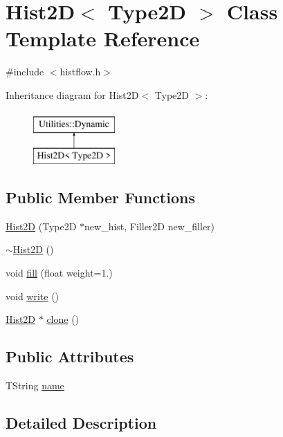 \hypertarget{classHist2D}{}\section{Hist2D$<$ Type2D $>$ Class Template Reference}
\label{classHist2D}


{\ttfamily \#include $<$histflow.\+h$>$}

Inheritance diagram for Hist2D$<$ Type2D $>$\+:\begin{figure}[H]
\begin{center}
\leavevmode
\includegraphics[height=2.000000cm]{classHist2D}
\end{center}
\end{figure}
\subsection*{Public Member Functions}
\begin{DoxyCompactItemize}
\item 
\hyperlink{classHist2D_a85a6f8b45d8752b1c50a3ea1c1436860}{Hist2D} (Type2D $\ast$new\+\_\+hist, Filler2D new\+\_\+filler)
\item 
\hyperlink{classHist2D_ae100dde5b1716fc0033102f3db6dece1}{$\sim$\+Hist2D} ()
\item 
void \hyperlink{classHist2D_a851f1d896300cb1962e5ac87a176cb08}{fill} (float weight=1.)
\item 
void \hyperlink{classHist2D_aea99923e54c6b1af26c2b399cf648231}{write} ()
\item 
\hyperlink{classHist2D}{Hist2D} $\ast$ \hyperlink{classHist2D_ae0326204255d619a3ec550f1086351e3}{clone} ()
\end{DoxyCompactItemize}
\subsection*{Public Attributes}
\begin{DoxyCompactItemize}
\item 
T\+String \hyperlink{classHist2D_ac84b99dc72ad3d9f85a46f7620ce1740}{name}
\end{DoxyCompactItemize}


\subsection{Detailed Description}
